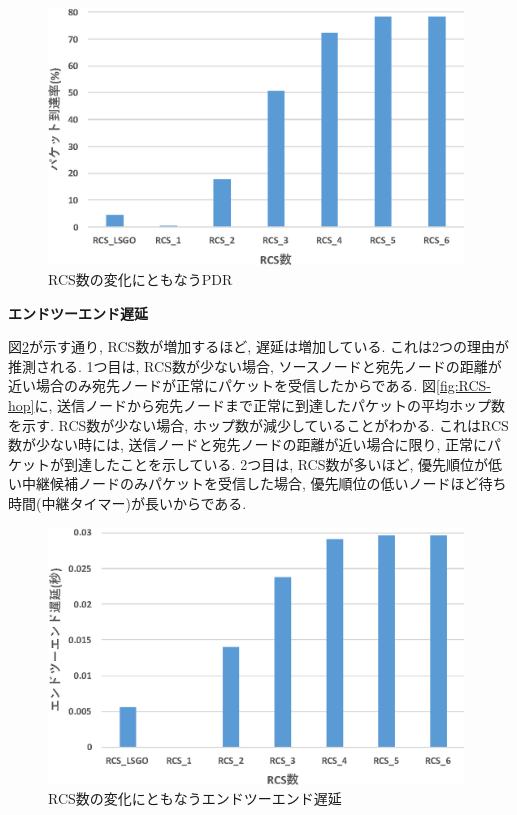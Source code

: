 \documentclass[10pt]{jreport}
\begin{document}
\begin{figure}[!ht]
	\centering
	\includegraphics[width=110mm]{figures/RCS_PDR.eps}
	\caption{RCS数の変化にともなうPDR}
	\label{fig:RCS-PDR}
\end{figure}

\par
\vspace{5mm}
\noindent
\textbf{エンドツーエンド遅延}
\vspace{5mm}

図\ref{fig:RCS-delay}が示す通り, RCS数が増加するほど, 遅延は増加している. これは2つの理由が推測される. 1つ目は, RCS数が少ない場合, ソースノードと宛先ノードの距離が近い場合のみ宛先ノードが正常にパケットを受信したからである. 図\ref{fig:RCS-hop}に, 送信ノードから宛先ノードまで正常に到達したパケットの平均ホップ数を示す. RCS数が少ない場合, ホップ数が減少していることがわかる. これはRCS数が少ない時には, 送信ノードと宛先ノードの距離が近い場合に限り, 正常にパケットが到達したことを示している.
2つ目は, RCS数が多いほど, 優先順位が低い中継候補ノードのみパケットを受信した場合, 優先順位の低いノードほど待ち時間(中継タイマー)が長いからである.




\begin{figure}[!ht]
	\centering
	\includegraphics[width=110mm]{figures/RCS_Delay.eps}
	\caption{RCS数の変化にともなうエンドツーエンド遅延}
	\label{fig:RCS-delay}
\end{figure}
\end{document}

